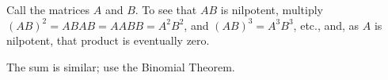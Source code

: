 \begin{exercises}
\begin{answer}
      Call the matrices \( A \) and \( B \).
      To see that \( AB \) is nilpotent, multiply
      $
         (AB)^2=ABAB=AABB=A^2B^2$,
      and
         $(AB)^3=A^3B^3$, etc.,
      and, as \( A \) is nilpotent, that product is eventually zero.

      The sum is similar; use the Binomial Theorem.  
     \end{answer}


\end{exercises}
